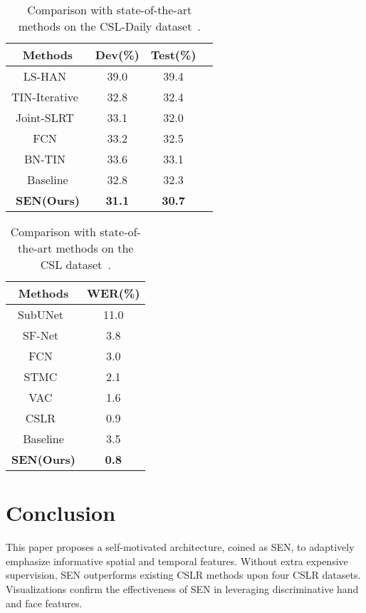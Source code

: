 \documentclass[letterpaper]{article} \usepackage{aaai23}  \usepackage{times}  \usepackage{helvet}  \usepackage{courier}  \usepackage[hyphens]{url}  \usepackage{graphicx} \urlstyle{rm} \def\UrlFont{\rm}  \usepackage{natbib}  \usepackage{caption} \frenchspacing  \setlength{\pdfpagewidth}{8.5in} \setlength{\pdfpageheight}{11in} \usepackage{algorithm}
\begin{document}
\begin{table}[t]   
  \centering
  \setlength\tabcolsep{2pt}
  \begin{tabular}{cccc}
  \hline
  Methods&  Dev(\%) & Test(\%)\\
  \hline
LS-HAN~\cite{huang2018video}  & 39.0  & 39.4\\
  TIN-Iterative~\cite{cui2019deep}  & 32.8  & 32.4\\
  Joint-SLRT~\cite{camgoz2020sign}  & 33.1  & 32.0 \\
  FCN~\cite{cheng2020fully} & 33.2  & 32.5 \\
  BN-TIN~\cite{zhou2021improving} & 33.6  & 33.1 \\
  \hline
  Baseline & 32.8 & 32.3\\
  \textbf{SEN(Ours)} & \textbf{31.1} & \textbf{30.7} \\
  \hline
  \end{tabular}  
  \caption{Comparison with state-of-the-art methods on the CSL-Daily dataset~\cite{zhou2021improving}.} 
  \label{tab8}
  \end{table}

\begin{table}[t]   
  \centering
  \setlength\tabcolsep{2pt}
  \begin{tabular}{cc}
    \hline
    Methods&  WER(\%)\\
    \hline
SubUNet~\cite{cihan2017subunets}   & 11.0\\
    SF-Net~\cite{yang2019sf} & 3.8 \\
    FCN~\cite{cheng2020fully}   & 3.0 \\
    STMC~\cite{zhou2020spatial}  & 2.1 \\
    VAC~\cite{Min_2021_ICCV} & 1.6 \\
    CSLR~\cite{zuo2022c2slr} & 0.9 \\
    \hline
    Baseline  & 3.5\\
    \textbf{SEN(Ours)} & \textbf{0.8} \\
    \hline
    \end{tabular}  
    \caption{Comparison with state-of-the-art methods on the CSL dataset~\cite{huang2018video}.} 
    \label{tab9}

  \end{table}

\section{Conclusion}
This paper proposes a self-motivated architecture, coined as SEN, to adaptively emphasize informative spatial and temporal features. Without extra expensive supervision, SEN outperforms existing CSLR methods upon four CSLR datasets. Visualizations confirm the effectiveness of SEN in leveraging discriminative hand and face features.

\end{document}
